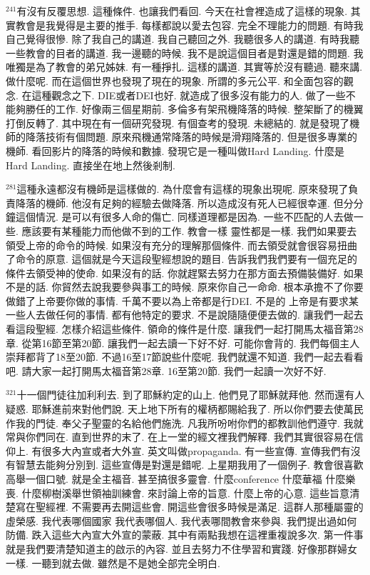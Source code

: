 \documentclass{book}
\begin{document}
$^{241}$有沒有反覆思想.
這種條件.
也讓我們看回.
今天在社會裡造成了這樣的現象.
其實教會是我覺得是主要的推手.
每樣都說以愛去包容.
完全不理能力的問題.
有時我自己覺得很慘.
除了我自己的講道.
我自己聽回之外.
我聽很多人的講道.
有時我聽一些教會的目者的講道.
我一邊聽的時候.
我不是說這個目者是對還是錯的問題.
我唯獨是為了教會的弟兄姊妹.
有一種掙扎.
這樣的講道.
其實等於沒有聽過.
聽來講.
做什麼呢.
而在這個世界也發現了現在的現象.
所謂的多元公平.
和全面包容的觀念.
在這種觀念之下.
DIE或者DEI也好.
就造成了很多沒有能力的人.
做了一些不能夠勝任的工作.
好像兩三個星期前.
多倫多有架飛機降落的時候.
整架斷了的機翼打倒反轉了.
其中現在有一個研究發現.
有個查考的發現.
未總結的.
就是發現了機師的降落技術有個問題.
原來飛機通常降落的時候是滑翔降落的.
但是很多專業的機師.
看回影片的降落的時候和數據.
發現它是一種叫做Hard Landing.
什麼是Hard Landing.
直接坐在地上然後剎制.

$^{281}$這種永遠都沒有機師是這樣做的.
為什麼會有這樣的現象出現呢.
原來發現了負責降落的機師.
他沒有足夠的經驗去做降落.
所以造成沒有死人已經很幸運.
但分分鐘這個情況.
是可以有很多人命的傷亡.
同樣道理都是因為.
一些不匹配的人去做一些.
應該要有某種能力而他做不到的工作.
教會一樣 靈性都是一樣.
我們如果要去領受上帝的命令的時候.
如果沒有充分的理解那個條件.
而去領受就會很容易扭曲了命令的原意.
這個就是今天這段聖經想說的題目.
告訴我們我們要有一個充足的條件去領受神的使命.
如果沒有的話.
你就趕緊去努力在那方面去預備裝備好.
如果不是的話.
你貿然去說我要參與事工的時候.
原來你自己一命命.
根本承擔不了你要做錯了上帝要你做的事情.
千萬不要以為上帝都是行DEI.
不是的 上帝是有要求某一些人去做任何的事情.
都有他特定的要求.
不是說隨隨便便去做的.
讓我們一起去看這段聖經.
怎樣介紹這些條件.
領命的條件是什麼.
讓我們一起打開馬太福音第28章.
從第16節至第20節.
讓我們一起去讀一下好不好.
可能你會背的.
我們每個主人崇拜都背了18至20節.
不過16至17節說些什麼呢.
我們就還不知道.
我們一起去看看吧.
請大家一起打開馬太福音第28章.
16至第20節.
我們一起讀一次好不好.

$^{321}$十一個門徒往加利利去.
到了耶穌約定的山上.
他們見了耶穌就拜他.
然而還有人疑惑.
耶穌進前來對他們說.
天上地下所有的權柄都賜給我了.
所以你們要去使萬民作我的門徒.
奉父子聖靈的名給他們施洗.
凡我所吩咐你們的都教訓他們遵守.
我就常與你們同在.
直到世界的末了.
在上一堂的經文裡我們解釋.
我們其實很容易在信仰上.
有很多大內宣或者大外宣.
英文叫做propaganda.
有一些宣傳.
宣傳我們有沒有智慧去能夠分別到.
這些宣傳是對還是錯呢.
上星期我用了一個例子.
教會很喜歡高舉一個口號.
就是全主福音.
甚至搞很多靈會.
什麼conference 什麼華福 什麼樂喪.
什麼柳樹溪舉世領袖訓練會.
來討論上帝的旨意.
什麼上帝的心意.
這些旨意清楚寫在聖經裡.
不需要再去開這些會.
開這些會很多時候是滿足.
這群人那種屬靈的虛榮感.
我代表哪個國家 我代表哪個人.
我代表哪間教會來參與.
我們提出過如何防備.
跌入這些大內宣大外宣的蒙蔽.
其中有兩點我想在這裡重複說多次.
第一件事就是我們要清楚知道主的啟示的內容.
並且去努力不住學習和實踐.
好像那群婦女一樣.
一聽到就去做.
雖然是不是她全部完全明白.
\end{document}
